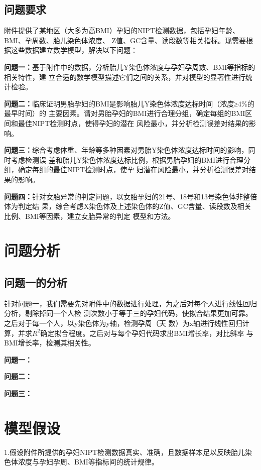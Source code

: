 \documentclass{article}
\begin{document}
\subsection{\textbf{问题要求}}
附件提供了某地区（大多为高BMI）孕妇的NIPT检测数据，包括孕妇年龄、BMI、孕周数、胎儿染色体浓度、
Z值、GC含量、读段数等相关指标。现需要根据这些数据建立数学模型，解决以下问题：

\textbf{问题一：}基于附件中的数据，分析胎儿Y染色体浓度与孕妇孕周数、BMI等指标的相关特性，建
立合适的数学模型描述它们之间的关系，并对模型的显著性进行统计检验。

\textbf{问题二：}临床证明男胎孕妇的BMI是影响胎儿Y染色体浓度达标时间（浓度≥4\%的最早时间）的
主要因素。请对男胎孕妇的BMI进行合理分组，确定每组的BMI区间和最佳NIPT检测时点，使得孕妇的潜在
风险最小，并分析检测误差对结果的影响。

\textbf{问题三：}综合考虑体重、年龄等多种因素对男胎Y染色体浓度达标时间的影响，同时考虑检测误
差和胎儿Y染色体浓度达标比例，根据男胎孕妇的BMI进行合理分组，确定每组的最佳NIPT检测时点，使孕
妇潜在风险最小，并分析检测误差对结果的影响。

\textbf{问题四：}针对女胎异常的判定问题，以女胎孕妇的21号、18号和13号染色体非整倍体为判定结
果，综合考虑X染色体及上述染色体的Z值、GC含量、读段数及相关比例、BMI等因素，建立女胎异常的判定
模型和方法。

\section{\textbf{问题分析}}
\subsection{\textbf{问题一的分析}}
针对问题一，我们需要先对附件中的数据进行处理，为之后对每个人进行线性回归分析，剔除掉同一个人检
测次数小于等于三的孕妇代码，使拟合结果更加可靠。之后对于每一个人，以y染色体为y轴，检测孕周（天
数）为x轴进行线性回归计算，并求$R^2$确定拟合程度。之后对与每个孕妇代码求出BMI增长率，对比斜率
与BMI增长率，检测其相关性。

\textbf{问题一：}

\textbf{问题二：}

\textbf{问题三：}

\section{\textbf{模型假设}}
1.假设附件所提供的孕妇NIPT检测数据真实、准确，且数据样本足以反映胎儿染色体浓度与孕妇孕周、BMI等指标间的统计规律。
\end{document}
